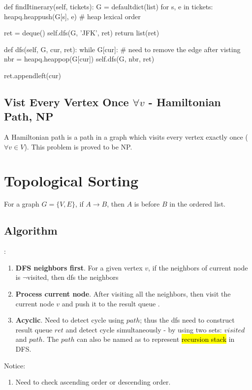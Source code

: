 \begin{python}
def findItinerary(self, tickets):
    G = defaultdict(list)
    for s, e in tickets:
        heapq.heappush(G[s], e)  # heap lexical order

    ret = deque()
    self.dfs(G, 'JFK', ret)
    return list(ret)

def dfs(self, G, cur, ret):
    while G[cur]:
        # need to remove the edge after visting
        nbr = heapq.heappop(G[cur])
        self.dfs(G, nbr, ret)

    ret.appendleft(cur)
\end{python}

\subsection{Vist Every Vertex Once $\forall v$ - Hamiltonian Path, NP} 

A Hamiltonian path is a path in a graph which visits every vertex exactly once ($\forall v \in V$). This problem is proved to be NP.

\section{Topological Sorting}
For a graph $G=\{V, E\}$, if $A \rightarrow B $, then $A$ is before $B$ in the ordered list.
\subsection{Algorithm}
:
\begin{enumerate}
\item \textbf{DFS neighbors first}. For a given vertex $v$, if the neighbors of current node is  $\neg$visited, then dfs the neighbors
\item \textbf{Process current node}. After visiting all the neighbors, then visit the current node $v$ and push it to the result queue .
\item \textbf{Acyclic}. Need to detect cycle using $path$; thus the dfs need to construct result queue $ret$ and detect cycle simultaneously - by using two sets: $visited$ and $path$. The $path$ can also be named as  to represent \hl{recursion stack} in DFS. 
\end{enumerate}
Notice:
\begin{enumerate}
\item Need to check ascending order or descending order.
\end{enumerate}


